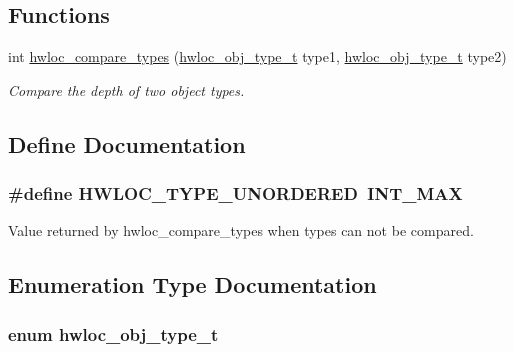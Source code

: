 \subsection*{Functions}
\begin{DoxyCompactItemize}
\item 
int \hyperlink{group__hwlocality__types_ga1820ea0dfd8e9dca28f9ea7624df5ae2}{hwloc\_\-compare\_\-types} (\hyperlink{group__hwlocality__types_gacd37bb612667dc437d66bfb175a8dc55}{hwloc\_\-obj\_\-type\_\-t} type1, \hyperlink{group__hwlocality__types_gacd37bb612667dc437d66bfb175a8dc55}{hwloc\_\-obj\_\-type\_\-t} type2)
\begin{DoxyCompactList}\small\item\em Compare the depth of two object types. \item\end{DoxyCompactList}\end{DoxyCompactItemize}


\subsection{Define Documentation}
\hypertarget{group__hwlocality__types_ga3b6e4128e9fe773863b123fa6e4a080b}{
\subsubsection[{HWLOC\_\-TYPE\_\-UNORDERED}]{\setlength{\rightskip}{0pt plus 5cm}\#define HWLOC\_\-TYPE\_\-UNORDERED~INT\_\-MAX}}
\label{group__hwlocality__types_ga3b6e4128e9fe773863b123fa6e4a080b}


Value returned by hwloc\_\-compare\_\-types when types can not be compared. 

\subsection{Enumeration Type Documentation}
\hypertarget{group__hwlocality__types_gacd37bb612667dc437d66bfb175a8dc55}{
\subsubsection[{hwloc\_\-obj\_\-type\_\-t}]{\setlength{\rightskip}{0pt plus 5cm}enum {\bf hwloc\_\-obj\_\-type\_\-t}}}
\label{group__hwlocality__types_gacd37bb612667dc437d66bfb175a8dc55}


